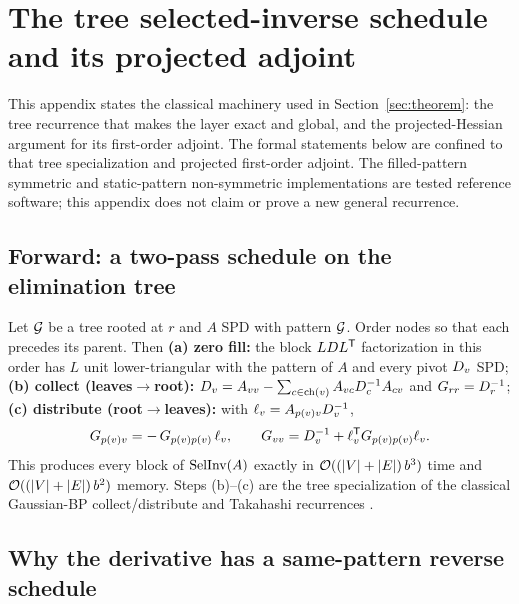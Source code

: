 \section{The tree selected-inverse schedule and its projected adjoint}
\label{app:theorem}

This appendix states the classical machinery used in
Section~\ref{sec:theorem}: the tree recurrence that makes the layer exact and
global, and the projected-Hessian argument for its first-order adjoint.
The formal statements below are confined to that tree specialization and
projected first-order adjoint. The filled-pattern symmetric and static-pattern
non-symmetric implementations are tested reference software; this appendix
does not claim or prove a new general recurrence.

\subsection{Forward: a two-pass schedule on the elimination tree}

\begin{theorem}
\label{thm:tree-forward}
Let $\mathcal{G}$ be a tree rooted at $r$ and $A$ SPD with pattern $\mathcal{G}$. Order nodes
so that each precedes its parent. Then \textbf{(a) zero fill:} the block
$LDL^{\mathsf{T}}$ factorization in this order has $L$ unit lower-triangular with the
pattern of $A$ and every pivot $D_{v}$ SPD; \textbf{(b) collect
(leaves$\to$root):}
$D_{v} = A_{vv} - \sum_{c\in\operatorname{ch}(v)} A_{vc}D_{c}^{-1}A_{cv}$
and $G_{rr} = D_{r}^{-1}$; \textbf{(c) distribute
(root$\to$leaves):} with $\ell_{v} = A_{p(v)v}D_{v}^{-1}$,
\[
  G_{p(v)v} = -\,G_{p(v)p(v)}\,\ell_{v},
  \qquad
  G_{vv} = D_{v}^{-1} + \ell_{v}^{\mathsf{T}} G_{p(v)p(v)} \ell_{v}.
\]
This produces every block of $\operatorname{SelInv}(A)$ exactly in
$\mathcal{O}((|V|+|E|)\,b^3)$ time and $\mathcal{O}((|V|+|E|)\,b^2)$ memory. Steps
(b)--(c) are the tree specialization of the classical Gaussian-BP
collect/distribute and Takahashi recurrences
\citep{weiss2001correctness,takahashi1973}.
\end{theorem}

\subsection{Why the derivative has a same-pattern reverse schedule}


